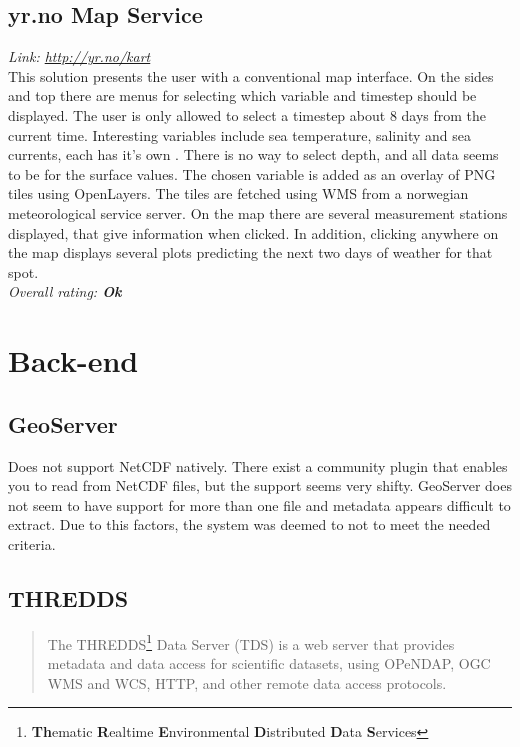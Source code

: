 \documentclass[11pt,a4paper,titlepage,oneside]{report}
\begin{document}
  \subsection{yr.no Map Service}
  \emph{Link: \url{http://yr.no/kart}} \\%
This solution presents the user with a conventional map interface. On the sides and top there are menus for selecting which variable and timestep should be displayed. The user is only allowed to select a timestep about 8 days from the current time. Interesting variables include sea temperature, salinity and sea currents, each has it’s own . There is no way to select depth, and all data seems to be for the surface values. The chosen variable is added as an overlay of PNG tiles using OpenLayers. The tiles are fetched using WMS from a norwegian meteorological service server. On the map there are several measurement stations displayed, that give information when clicked. In addition, clicking anywhere on the map displays several plots predicting the next two days of weather for that spot.
  \\ \emph{Overall rating: \textbf{Ok}}

\section{Back-end}

\subsection{GeoServer}
Does not support NetCDF natively. There exist a community plugin that enables you to read from NetCDF files, but the support seems very shifty. GeoServer does not seem to have support for more than one file and metadata appears difficult to extract. Due to this factors, the system was deemed to not to meet the needed criteria.

\subsection{THREDDS}
\begin{quote}
The THREDDS\footnote{\textbf{Th}ematic \textbf{R}ealtime \textbf{E}nvironmental \textbf{D}istributed \textbf{D}ata \textbf{S}ervices} Data Server (TDS) is a web server that provides metadata and data access for scientific datasets, using OPeNDAP, OGC WMS and WCS, HTTP, and other remote data access protocols. \cite{TDS:Web}
\end{quote}
\end{document}
